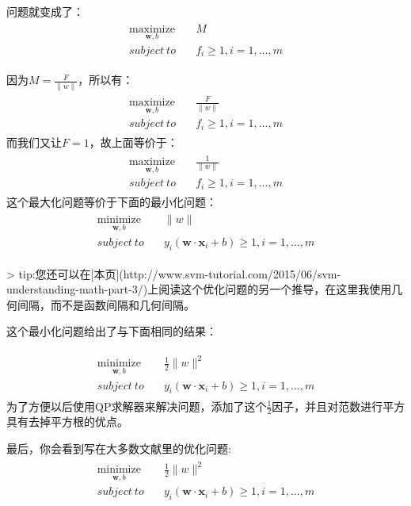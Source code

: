 问题就变成了：
\begin{gather*}
\begin{align*}
\underset{\mathbf{w},b}{\text{maximize}} \quad &M \\
subject\ to\quad &f_i \geq 1,i=1,\dots,m
\end{align*}
\end{gather*}

因为$M=\frac{F}{\|w\|}$，所以有：
\begin{gather*}
\begin{align*}
\underset{\mathbf{w},b}{\text{maximize}} \quad &\frac{F}{\|w\|} \\
subject\ to\quad &f_i \geq 1,i=1,\dots,m
\end{align*}
\end{gather*}
而我们又让$F=1$，故上面等价于：
\begin{gather*}
\begin{align*}
\underset{\mathbf{w},b}{\text{maximize}} \quad &\frac{1}{\|w\|} \\
subject\ to\quad &f_i \geq 1,i=1,\dots,m
\end{align*}
\end{gather*}
这个最大化问题等价于下面的最小化问题：
\begin{gather*}
\begin{align*}
\underset{\mathbf{w},b}{\text{minimize}} \quad &\|w\| \\
subject\ to\quad &y_i(\mathbf{w}\cdot\mathbf{x}_i+b) \geq 1,i=1,\dots,m
\end{align*}
\end{gather*}

> tip:您还可以在[本页](http://www.svm-tutorial.com/2015/06/svm-understanding-math-part-3/)上阅读这个优化问题的另一个推导，在这里我使用几何间隔，而不是函数间隔和几何间隔。

这个最小化问题给出了与下面相同的结果：

\begin{gather*}
\begin{align*}
\underset{\mathbf{w},b}{\text{minimize}} \quad &\frac{1}{2}\|w\|^2 \\
subject\ to\quad &y_i(\mathbf{w}\cdot\mathbf{x}_i+b) \geq 1,i=1,\dots,m
\end{align*}
\end{gather*}
为了方便以后使用QP求解器来解决问题，添加了这个$\frac{1}{2}$因子，并且对范数进行平方具有去掉平方根的优点。

最后，你会看到写在大多数文献里的优化问题:
\begin{gather*}
\begin{align*}
\underset{\mathbf{w},b}{\text{minimize}} \quad &\frac{1}{2}\|w\|^2 \\
subject\ to\quad &y_i(\mathbf{w}\cdot\mathbf{x}_i+b) \geq 1,i=1,\dots,m
\end{align*}
\end{gather*}

